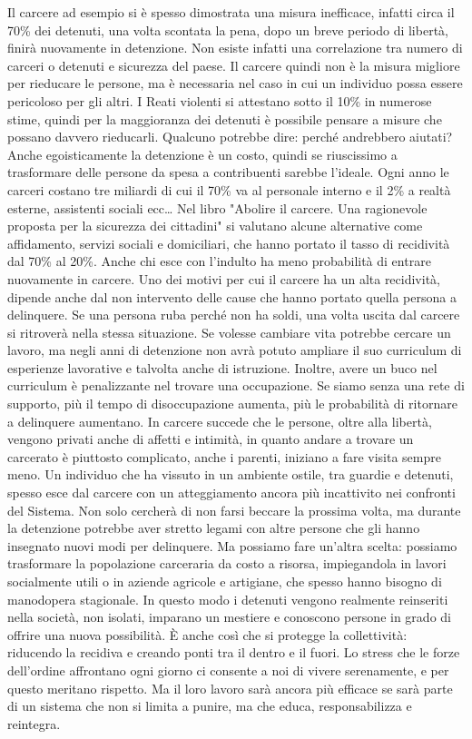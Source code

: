 \documentclass[12pt]{book} %
\begin{document}
Il carcere ad esempio si è spesso dimostrata una misura inefficace, infatti circa il 70\% dei detenuti, una volta scontata la pena, dopo un breve periodo di libertà, finirà nuovamente in detenzione. Non esiste infatti una correlazione tra numero di carceri o detenuti e sicurezza del paese. Il carcere quindi non è la misura migliore per rieducare le persone, ma è necessaria nel caso in cui un individuo possa essere pericoloso per gli altri.
I Reati violenti si attestano sotto il 10\% in numerose stime, quindi per la maggioranza dei detenuti è possibile pensare a misure che possano davvero rieducarli.
Qualcuno potrebbe dire: perché andrebbero aiutati? Anche egoisticamente la detenzione è un costo, quindi se riuscissimo a trasformare delle persone da spesa a contribuenti sarebbe l'ideale. Ogni anno le carceri costano tre miliardi di cui il 70\% va al personale interno e il 2\% a realtà esterne,
assistenti sociali ecc…
Nel libro "Abolire il carcere. Una ragionevole proposta per la sicurezza dei cittadini"  si valutano alcune alternative come affidamento, servizi sociali e domiciliari, che hanno portato il tasso
di recidività dal 70\% al 20\%. Anche chi esce con l'indulto ha meno probabilità di entrare nuovamente in carcere. 
Uno dei motivi per cui il carcere ha un alta recidività, dipende anche dal non intervento delle cause che hanno portato quella persona a delinquere.
Se una persona ruba perché non ha soldi, una volta uscita dal carcere si ritroverà nella stessa situazione.
Se volesse cambiare vita potrebbe cercare un lavoro, ma negli anni di detenzione non avrà potuto ampliare il suo curriculum di esperienze lavorative e talvolta anche di istruzione. Inoltre, avere un buco nel curriculum è penalizzante nel trovare una occupazione. 
Se siamo senza una rete di supporto, più il tempo di disoccupazione aumenta, più le probabilità di ritornare a delinquere aumentano.
In carcere succede che le persone, oltre alla libertà, vengono privati anche di affetti e intimità, in quanto andare
a trovare un carcerato è piuttosto complicato, anche i parenti, iniziano a fare visita sempre meno. 
Un individuo che ha vissuto in un ambiente ostile, tra guardie e detenuti, spesso esce dal carcere con un atteggiamento ancora più incattivito nei confronti del Sistema. Non solo cercherà di non farsi beccare la prossima volta, ma durante la detenzione potrebbe aver stretto legami con altre persone che gli hanno insegnato nuovi modi per delinquere.
Ma possiamo fare un’altra scelta: possiamo trasformare la popolazione carceraria da costo a risorsa, impiegandola in lavori socialmente utili o in aziende agricole e artigiane, che spesso hanno bisogno di manodopera stagionale. In questo modo i detenuti vengono realmente reinseriti nella società, non isolati, imparano un mestiere e conoscono persone in grado di offrire una nuova possibilità.
È anche così che si protegge la collettività: riducendo la recidiva e creando ponti tra il dentro e il fuori. Lo stress che le forze dell’ordine affrontano ogni giorno ci consente a noi di vivere serenamente, e per questo meritano rispetto. Ma il loro lavoro sarà ancora più efficace se sarà parte di un sistema che non si limita a punire, ma che educa, responsabilizza e reintegra.
\end{document}
